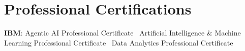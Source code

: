 \section{Professional Certifications}

\small
\textbf{IBM}: Agentic AI Professional Certificate \textbar\
Artificial Intelligence \& Machine Learning Professional Certificate \textbar\
Data Analytics Professional Certificate